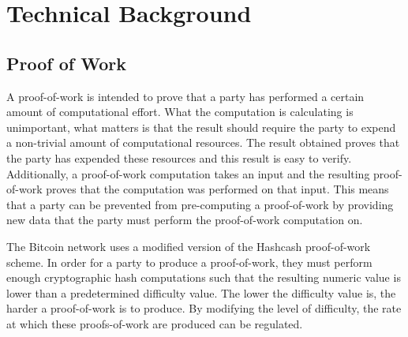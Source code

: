 \documentclass[ %
                    author={Luke Murray},
                supervisor={Dr. Simon Hollis},
                     title={Shadow Peer-to-Peer Networks},
                  subtitle={},
                    degree={MEng},
                      year={2013} ]{thesis}
\begin{document}

\chapter{Technical Background}
\label{chap:technical}

\section{Proof of Work}

A proof-of-work is intended to prove that a party has performed a certain amount of computational effort. What the computation is calculating is unimportant, what matters is that the result should require the party to expend a non-trivial amount of computational resources. The result obtained proves that the party has expended these resources and this result is easy to verify. Additionally, a proof-of-work computation takes an input and the resulting proof-of-work proves that the computation was performed on that input. This means that a party can be prevented from pre-computing a proof-of-work by providing new data that the party must perform the proof-of-work computation on.

The Bitcoin network uses a modified version of the Hashcash \cite{back2002hashcash} proof-of-work scheme. In order for a party to produce a proof-of-work, they must perform enough cryptographic hash computations such that the resulting numeric value is lower than a predetermined difficulty value. The lower the difficulty value is, the harder a proof-of-work is to produce. By modifying the level of difficulty, the rate at which these proofs-of-work are produced can be regulated.
\end{document}
